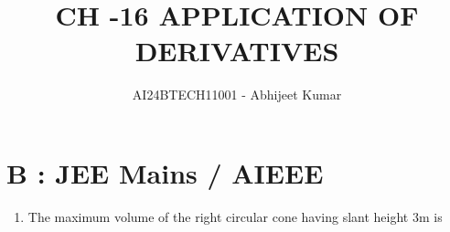 \documentclass[article,12pt,onecolumn]{IEEEtran}
\theoremstyle{remark}
\begin{document}

\vspace{3cm}

\title{CH -16 APPLICATION OF DERIVATIVES}
\author{AI24BTECH11001 - Abhijeet Kumar}
\maketitle
\bigskip
\section{B : JEE Mains / AIEEE}
\renewcommand{\thefigure}{\theenumi}
\renewcommand{\thetable}{\theenumi}
\begin{enumerate}[start=40]

\item The maximum volume  of the right circular cone having slant height 3m is 


\end{enumerate}
\end{document}
